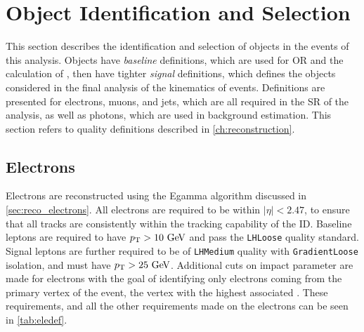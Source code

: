 
\chapter{Object Identification and Selection} %
\label{ch:objects} 

This section describes the identification and selection of objects in the events of this analysis. Objects have \textit{baseline} definitions, which are used for \acf{OR} and the calculation of \met, then have tighter \textit{signal} definitions, which defines the objects considered in the final analysis of the kinematics of events. Definitions are presented for electrons, muons, and jets, which are all required in the \ac{SR} of the analysis, as well as photons, which are used in background estimation. This section refers to quality definitions described in \autoref{ch:reconstruction}.


\section{Electrons}

Electrons are reconstructed using the Egamma algorithm discussed in \autoref{sec:reco_electrons}. All electrons are required to be within $|\eta|<2.47$, to ensure that all tracks are consistently within the tracking capability of the \ac{ID}. Baseline leptons are required to have $\pt>10\gev$ and pass the \texttt{LHLoose} quality standard. Signal leptons are further required to be of \texttt{LHMedium} quality with \texttt{GradientLoose} isolation, and must have $\pt>25\gev$. Additional cuts on impact parameter are made for electrons with the goal of identifying only electrons coming from the primary vertex of the event, the vertex with the highest associated \pt. These requirements, and all the other requirements made on the electrons can be seen in \autoref{tab:eledef}. 


